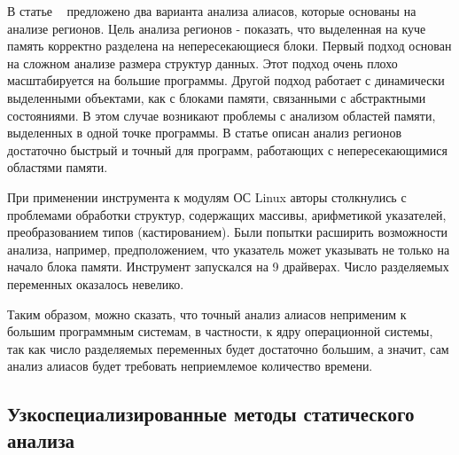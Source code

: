В статье ~\cite{Seidl:2009} предложено два варианта анализа алиасов, которые основаны на анализе регионов.
Цель анализа регионов - показать, что выделенная на куче память корректно разделена на непересекающиеся блоки.
Первый подход основан на сложном анализе размера структур данных. Этот подход очень плохо масштабируется на большие программы.
Другой подход работает с динамически выделенными объектами, как с блоками памяти, связанными с абстрактными состояниями.
В этом случае возникают проблемы с анализом областей памяти, выделенных в одной точке программы.
В статье описан анализ регионов достаточно быстрый и точный для программ, работающих с непересекающимися областями памяти.

При применении инструмента к модулям ОС Linux авторы столкнулись с проблемами обработки структур, содержащих массивы, арифметикой указателей, преобразованием типов (кастированием).
Были попытки расширить возможности анализа, например, предположением, что указатель может указывать не только на начало блока памяти. 
Инструмент запускался на 9 драйверах. Число разделяемых переменных оказалось невелико.

Таким образом, можно сказать, что точный анализ алиасов неприменим к большим программным системам, в частности, к ядру операционной системы, так как число разделяемых переменных будет достаточно большим, а значит, сам анализ алиасов будет требовать неприемлемое количество времени.


\subsection{Узкоспециализированные методы статического анализа}


